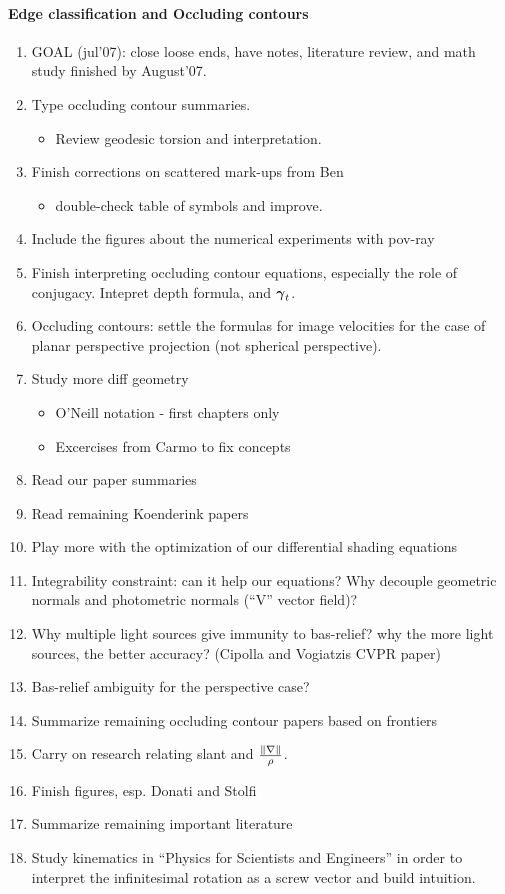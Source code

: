 \paragraph{Edge classification and Occluding contours}
\begin{enumerate}
\item GOAL (jul'07): close loose ends, have notes, literature review, and math
study finished by August'07.
\item Type occluding contour summaries.
\begin{itemize}
  \item Review geodesic torsion and interpretation.
\end{itemize}
\item Finish corrections on scattered mark-ups from Ben
\begin{itemize}
\item double-check table of symbols and improve.
\end{itemize}
\item Include the figures about the numerical experiments with pov-ray
\item Finish interpreting occluding contour equations, especially the role of
conjugacy. Intepret depth formula, and $\boldsymbol{\gamma}_t$.
\item Occluding contours: settle the formulas for image velocities for the case of
planar perspective projection (not spherical perspective).
\item Study more diff geometry
  \begin{itemize}
  \item O'Neill notation - first chapters only
  \item Excercises from Carmo to fix concepts
  \end{itemize}
\item Read our paper summaries
\item Read remaining Koenderink papers
\item Play more with the optimization of our differential shading equations
\item Integrability constraint: can it help our equations? Why decouple
geometric normals and photometric normals (``V'' vector field)?
\item Why multiple light sources give immunity to bas-relief? why the more
light sources, the better accuracy? (Cipolla and
Vogiatzis CVPR paper)
\item Bas-relief ambiguity for the perspective case?
\item Summarize remaining occluding contour papers based on frontiers
\item Carry on research relating slant and $\frac{\|\nabla\|}{\rho}$.
\item Finish figures, esp. Donati and Stolfi
\item Summarize remaining important literature
\item Study kinematics in ``Physics for Scientists and Engineers'' in order to
interpret the infinitesimal rotation as a screw vector and build intuition.
\end{enumerate}
